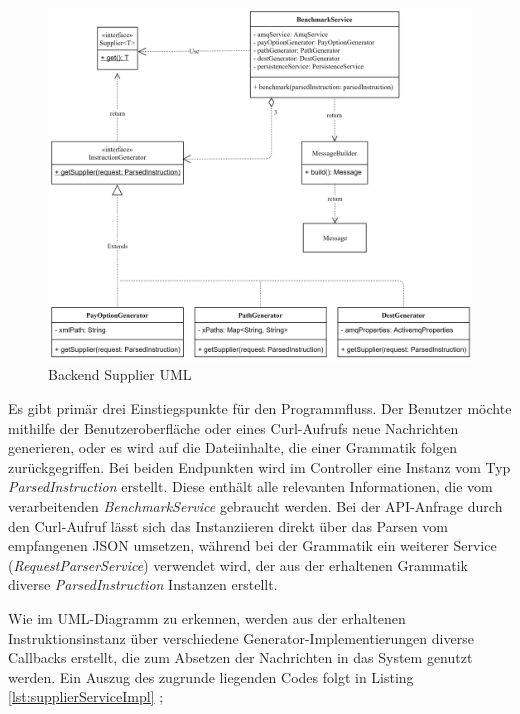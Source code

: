 \begin{figure}[ht!]
	\centering
	\includegraphics[width=\linewidth]{kapitel/problemloesung/implementierung/_img/supplier-uml}
	\caption[Backend Supplier UML]{Backend Supplier UML}
	\label{fig:supplierUml}
\end{figure}

Es gibt primär drei Einstiegspunkte für den Programmfluss. Der Benutzer möchte mithilfe der Benutzeroberfläche oder eines Curl-Aufrufs neue Nachrichten generieren, oder es wird auf die Dateiinhalte, die einer Grammatik folgen zurückgegriffen. Bei beiden Endpunkten wird im Controller eine Instanz vom Typ \emph{ParsedInstruction} erstellt. Diese enthält alle relevanten Informationen, die vom verarbeitenden \emph{BenchmarkService} gebraucht werden. Bei der API-Anfrage durch den Curl-Aufruf lässt sich das Instanziieren direkt über das Parsen vom empfangenen JSON umsetzen, während bei der Grammatik ein weiterer Service (\emph{RequestParserService}) verwendet wird, der aus der erhaltenen Grammatik diverse \emph{ParsedInstruction} Instanzen erstellt.

Wie im UML-Diagramm zu erkennen, werden aus der erhaltenen Instruktionsinstanz über verschiedene Generator-Implementierungen diverse Callbacks erstellt, die zum Absetzen der Nachrichten in das System genutzt werden. Ein Auszug des zugrunde liegenden Codes folgt in Listing \ref{lst:supplierServiceImpl} ;

\newpage

